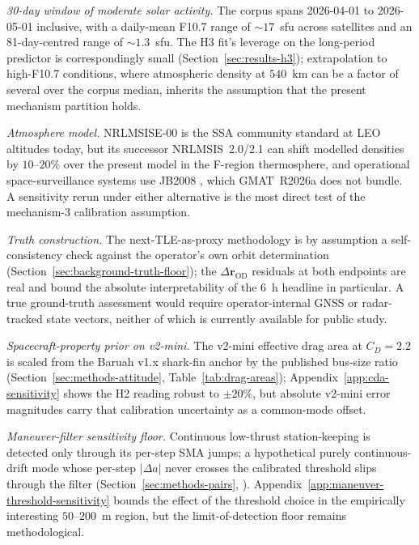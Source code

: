 \documentclass[10pt, letterpaper]{article}
\begin{document}
\emph{30-day window of moderate solar activity.} The corpus spans
2026-04-01 to 2026-05-01 inclusive, with a daily-mean
F10.7 range of $\sim 17$~sfu across satellites and an
81-day-centred range of $\sim 1.3$~sfu. The H3 fit's leverage on
the long-period predictor is correspondingly small
(Section~\ref{sec:results-h3}); extrapolation to high-F10.7
conditions, where atmospheric density at $540$~km can be a factor
of several over the corpus median, inherits the assumption that
the present mechanism partition holds.

\emph{Atmosphere model.} NRLMSISE-00 is the SSA community
standard at LEO altitudes today, but its successor NRLMSIS~2.0/2.1
\citep{emmert2021} can shift modelled densities by $10$--$20\%$
over the present model in the F-region thermosphere, and
operational space-surveillance systems use JB2008
\citep{bowman2008}, which GMAT~R2026a does not bundle. A
sensitivity rerun under either alternative is the most direct test
of the mechanism-3 calibration assumption.

\emph{Truth construction.} The next-TLE-as-proxy methodology is by
assumption a self-consistency check against the operator's own
orbit determination
(Section~\ref{sec:background-truth-floor}); the
$\Delta\mathbf{r}_{\mathrm{OD}}$ residuals at both endpoints are
real and bound the absolute interpretability of the $6$~h headline
in particular. A true ground-truth assessment would require
operator-internal GNSS or radar-tracked state vectors, neither of
which is currently available for public study.

\emph{Spacecraft-property prior on v2-mini.} The v2-mini effective
drag area at $C_{D} = 2.2$ is scaled from the Baruah v1.x
shark-fin anchor by the published bus-size ratio
(Section~\ref{sec:methods-attitude}, Table~\ref{tab:drag-areas});
Appendix~\ref{app:cda-sensitivity} shows the H2 reading robust to
$\pm 20\%$, but absolute v2-mini error magnitudes carry that
calibration uncertainty as a common-mode offset.

\emph{Maneuver-filter sensitivity floor.} Continuous low-thrust
station-keeping is detected only through its per-step SMA jumps;
a hypothetical purely continuous-drift mode whose per-step
$\lvert\Delta a\rvert$ never crosses the calibrated threshold
slips through the filter (Section~\ref{sec:methods-pairs},
\citealp[\S\,3.2]{lemmens2014}).
Appendix~\ref{app:maneuver-threshold-sensitivity} bounds the
effect of the threshold choice in the empirically interesting
$50$--$200$~m region, but the limit-of-detection floor remains
methodological.
\end{document}
